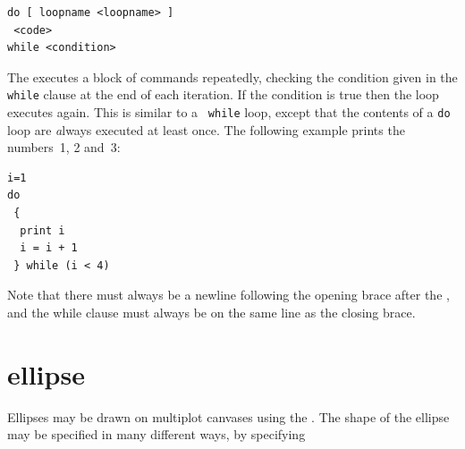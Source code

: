 \begin{verbatim}
do [ loopname <loopname> ]
 <code>
while <condition>
\end{verbatim}

The  executes a block of commands repeatedly, checking the
condition given in the {\tt while} clause at the end of each iteration.  If the
condition is true then the loop executes again. This is similar to a {\tt
while} loop, except that the contents of a {\tt do} loop are {\emph always}
executed at least once.  The following example prints the numbers~1, 2 and~3:

\begin{verbatim}
i=1
do
 {
  print i
  i = i + 1
 } while (i < 4)
\end{verbatim}

\noindent Note that there must always be a newline following the opening brace
after the , and the while clause must always be on the same line as
the closing brace.


\section{ellipse}

Ellipses may be drawn on multiplot canvases using the . The shape
of the ellipse may be specified in many different ways, by specifying

